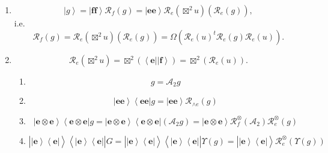 \documentclass[aps,preprint]{revtex4}%
\begin{document}
\begin{enumerate}
\item
\begin{equation}
\left\vert g\right\rangle =\left\vert \mathbf{ff}\right\rangle \mathcal{R}%
_{f}\left(  g\right)  =\left\vert \mathbf{ee}\right\rangle \mathcal{R}%
_{e}\left(  \boxtimes^{2}u\right)  \left(  \overset{}{\mathcal{R}_{e}\left(
g\right)  }\right)  ,
\end{equation}
i.e.
\begin{equation}
\mathcal{R}_{f}\left(  g\right)  =\mathcal{R}_{e}\left(  \boxtimes
^{2}u\right)  \left(  \overset{}{\mathcal{R}_{e}\left(  g\right)  }\right)
=\Omega\left(  \overset{}{\mathcal{R}_{e}\left(  u\right)  ^{t}\mathcal{R}%
_{e}\left(  g\right)  \mathcal{R}_{e}\left(  u\right)  }\right)  .
\end{equation}


\item
\begin{equation}
\mathcal{R}_{e}\left(  \boxtimes^{2}u\right)  =\boxtimes^{2}\left(
\left\langle \mathbf{e}\right\vert \left\vert \mathbf{f}\right\rangle \right)
=\boxtimes^{2}\left(  \mathcal{R}_{e}\left(  u\right)  \right)  .
\end{equation}


\begin{enumerate}
\item
\begin{equation}
g=\mathcal{A}_{2}g
\end{equation}


\item
\begin{equation}
\left\vert \mathbf{ee}\right\rangle \left\langle \mathbf{ee}\right\vert
g=\left\vert \mathbf{ee}\right\rangle \mathcal{R}_{\wedge e}\left(  g\right)
\end{equation}


\item
\begin{equation}
\left\vert \mathbf{e\otimes e}\right\rangle \left\langle \mathbf{e\otimes
e}\right\vert g=\left\vert \mathbf{e\otimes e}\right\rangle \left\langle
\mathbf{e\otimes e}\right\vert \left(  \mathcal{A}_{2}g\right)  =\left\vert
\mathbf{e\otimes e}\right\rangle \mathcal{R}_{f}^{\otimes}\left(
\mathcal{A}_{2}\right)  \mathcal{R}_{e}^{\otimes}\left(  g\right)
\end{equation}


\item
\begin{equation}
\left\vert \overset{}{\left\vert \mathbf{e}\right\rangle \left\langle
\mathbf{e}\right\vert }\right\rangle \left\langle \overset{}{\left\vert
\mathbf{e}\right\rangle \left\langle \mathbf{e}\right\vert }\right\vert
G=\left\vert \overset{}{\left\vert \mathbf{e}\right\rangle \left\langle
\mathbf{e}\right\vert }\right\rangle \left\langle \overset{}{\left\vert
\mathbf{e}\right\rangle \left\langle \mathbf{e}\right\vert }\right\vert
\Upsilon\left(  g\right)  =\left\vert \overset{}{\left\vert \mathbf{e}%
\right\rangle \left\langle \mathbf{e}\right\vert }\right\rangle \mathcal{R}%
_{e}^{\otimes}\left(  \Upsilon\left(  g\right)  \right)
\end{equation}


\end{enumerate}
\end{enumerate}
\end{document}

